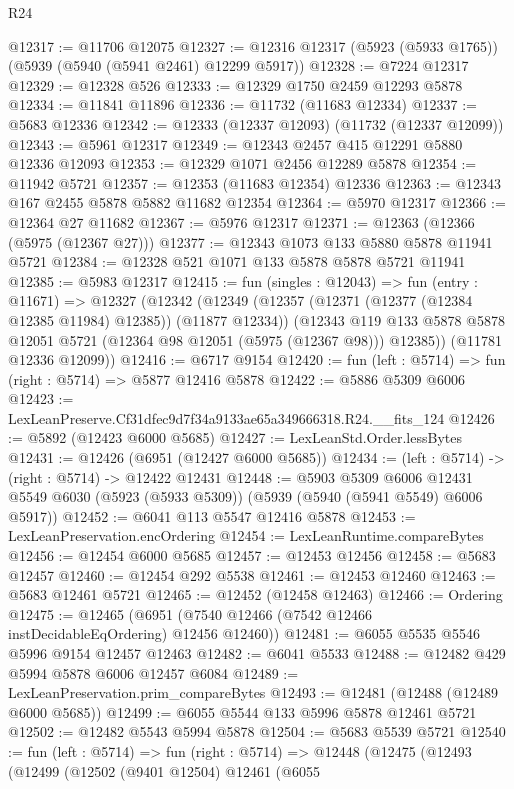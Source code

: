 \begin{lexlean}{R24}
\begin{coremodule}
@12317 := @11706 @12075
@12327 := @12316 @12317 (@5923 (@5933 @1765)) (@5939 (@5940 (@5941 @2461) @12299 @5917))
@12328 := @7224 @12317
@12329 := @12328 @526
@12333 := @12329 @1750 @2459 @12293 @5878
@12334 := @11841 @11896
@12336 := @11732 (@11683 @12334)
@12337 := @5683 @12336
@12342 := @12333 (@12337 @12093) (@11732 (@12337 @12099))
@12343 := @5961 @12317
@12349 := @12343 @2457 @415 @12291 @5880 @12336 @12093
@12353 := @12329 @1071 @2456 @12289 @5878
@12354 := @11942 @5721
@12357 := @12353 (@11683 @12354) @12336
@12363 := @12343 @167 @2455 @5878 @5882 @11682 @12354
@12364 := @5970 @12317
@12366 := @12364 @27 @11682
@12367 := @5976 @12317
@12371 := @12363 (@12366 (@5975 (@12367 @27)))
@12377 := @12343 @1073 @133 @5880 @5878 @11941 @5721
@12384 := @12328 @521 @1071 @133 @5878 @5878 @5721 @11941
@12385 := @5983 @12317
@12415 := fun (singles : @12043) =>
  fun (entry : @11671) =>
  @12327
    (@12342
      (@12349
        (@12357 (@12371 (@12377 (@12384 @12385 @11984) @12385)) (@11877 @12334))
        (@12343 @119 @133 @5878 @5878 @12051 @5721 (@12364 @98 @12051 (@5975 (@12367 @98))) @12385))
      (@11781 @12336 @12099))
@12416 := @6717 @9154
@12420 := fun (left : @5714) => fun (right : @5714) => @5877 @12416 @5878
@12422 := @5886 @5309 @6006
@12423 := LexLeanPreserve.Cf31dfec9d7f34a9133ae65a349666318.R24.__fits_124
@12426 := @5892 (@12423 @6000 @5685)
@12427 := LexLeanStd.Order.lessBytes
@12431 := @12426 (@6951 (@12427 @6000 @5685))
@12434 := (left : @5714) -> (right : @5714) -> @12422 @12431
@12448 := @5903
    @5309
    @6006
    @12431
    @5549
    @6030
    (@5923 (@5933 @5309))
    (@5939 (@5940 (@5941 @5549) @6006 @5917))
@12452 := @6041 @113 @5547 @12416 @5878
@12453 := LexLeanPreservation.encOrdering
@12454 := LexLeanRuntime.compareBytes
@12456 := @12454 @6000 @5685
@12457 := @12453 @12456
@12458 := @5683 @12457
@12460 := @12454 @292 @5538
@12461 := @12453 @12460
@12463 := @5683 @12461 @5721
@12465 := @12452 (@12458 @12463)
@12466 := Ordering
@12475 := @12465 (@6951 (@7540 @12466 (@7542 @12466 instDecidableEqOrdering) @12456 @12460))
@12481 := @6055 @5535 @5546 @5996 @9154 @12457 @12463
@12482 := @6041 @5533
@12488 := @12482 @429 @5994 @5878 @6006 @12457 @6084
@12489 := LexLeanPreservation.prim_compareBytes
@12493 := @12481 (@12488 (@12489 @6000 @5685))
@12499 := @6055 @5544 @133 @5996 @5878 @12461 @5721
@12502 := @12482 @5543 @5994 @5878
@12504 := @5683 @5539 @5721
@12540 := fun (left : @5714) =>
  fun (right : @5714) =>
  @12448
    (@12475
      (@12493
        (@12499
          (@12502
            (@9401 @12504)
            @12461
            (@6055

\end{coremodule}
\end{lexlean}
